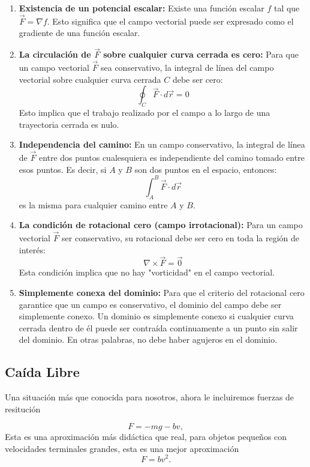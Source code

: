 \begin{enumerate}
    \item \textbf{Existencia de un potencial escalar:} Existe una función escalar $f$ tal que $\vec{F} = \nabla f$. Esto significa que el campo vectorial puede ser expresado como el gradiente de una función escalar.
    
    \item \textbf{La circulación de $\vec{F}$ sobre cualquier curva cerrada es cero:} Para que un campo vectorial $\vec{F}$ sea conservativo, la integral de línea del campo vectorial sobre cualquier curva cerrada $C$ debe ser cero:
    $$
    \oint_{C} \vec{F} \cdot d\vec{r} = 0
    $$
    Esto implica que el trabajo realizado por el campo a lo largo de una trayectoria cerrada es nulo.
    
    \item \textbf{Independencia del camino:} En un campo conservativo, la integral de línea de $\vec{F}$ entre dos puntos cualesquiera es independiente del camino tomado entre esos puntos. Es decir, si $A$ y $B$ son dos puntos en el espacio, entonces:
    $$
    \int_{A}^{B} \vec{F} \cdot d\vec{r}
    $$
    es la misma para cualquier camino entre $A$ y $B$.
    
    \item \textbf{La condición de rotacional cero (campo irrotacional):} Para un campo vectorial $\vec{F}$ ser conservativo, su rotacional debe ser cero en toda la región de interés:
    $$
    \nabla \times \vec{F} = \vec{0}
    $$
    Esta condición implica que no hay "vorticidad" en el campo vectorial.
    
    \item \textbf{Simplemente conexa del dominio:} Para que el criterio del rotacional cero garantice que un campo es conservativo, el dominio del campo debe ser simplemente conexo. Un dominio es simplemente conexo si cualquier curva cerrada dentro de él puede ser contraída continuamente a un punto sin salir del dominio. En otras palabras, no debe haber agujeros en el dominio.
\end{enumerate}



\subsection{Caída Libre}
Una situación más que conocida para nosotros, ahora le incluiremos fuerzas de resitución

\begin{equation}
	F = -mg - bv,
\end{equation}
Esta es una aproximación más didáctica que real, para objetos pequeños con velocidades terminales grandes, esta es una mejor aproximación
\begin{equation}
	F = bv^2.
\end{equation}



